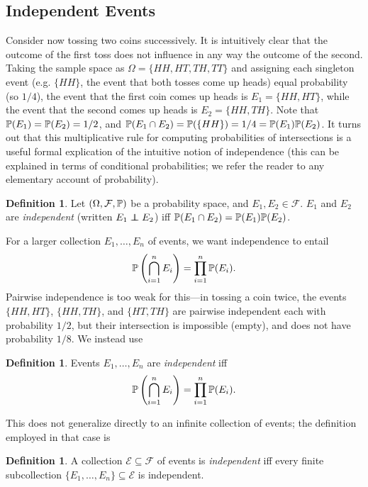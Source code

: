 \documentclass{article}
\theoremstyle{definition}
\newtheorem{definition}[theorem]{Definition}
\newcommand\indep{\protect\mathpalette{\protect\independenT}{\perp}}
\def\independenT#1#2{\mathrel{\rlap{$#1#2$}\mkern2mu{#1#2}}}
\begin{document}
\subsection{Independent Events}

Consider now tossing two coins successively. It is intuitively clear that the outcome of the first toss does not influence in any way the outcome of the second. Taking the sample space as $\Omega = \{HH, HT, TH, TT\}$ and assigning each singleton event (e.g. $\{HH\}$, the event that both tosses come up heads) equal probability (so $1/4$), the event that the first coin comes up heads is $E_1 = \{HH, HT\}$, while the event that the second comes up heads is $E_2 = \{HH, TH\}$. Note that $\P(E_1) = \P(E_2) = 1/2$, and $\P(E_1 \cap E_2) = \P(\{HH\}) = 1/4 = \P(E_1) \P(E_2)$. It turns out that this multiplicative rule for computing probabilities of intersections is a useful formal explication of the intuitive notion of independence (this can be explained in terms of conditional probabilities; we refer the reader to any elementary account of probability).

\begin{definition}
Let $(\Omega, \mathcal F, \P)$ be a probability space, and $E_1, E_2 \in \mathcal F$. $E_1$ and $E_2$ are {\em independent} (written $E_1 \indep E_2$) iff $\P(E_1 \cap E_2) = \P(E_1) \P(E_2)$.
\end{definition}

For a larger collection $E_1, \ldots, E_n$ of events, we want independence to entail
\[ \P\left(\bigcap_{i=1}^n E_i\right) = \prod_{i=1}^n \P(E_i). \]
Pairwise independence is too weak for this---in tossing a coin twice, the events $\{HH,HT\}$, $\{HH,TH\}$, and $\{HT,TH\}$ are pairwise independent each with probability $1/2$, but their intersection is impossible (empty), and does not have probability $1/8$. We instead use

\begin{definition}
Events $E_1, \ldots, E_n$ are {\em independent} iff
\[ \P\left(\bigcap_{i=1}^n E_i\right) = \prod_{i=1}^n \P(E_i). \]
\end{definition}

This does not generalize directly to an infinite collection of events; the definition employed in that case is

\begin{definition}
A collection $\mathcal E \subseteq \mathcal F$ of events is {\em independent} iff every finite subcollection $\{E_1, \ldots, E_n\} \subseteq \mathcal E$ is independent.
\end{definition}
\end{document}
